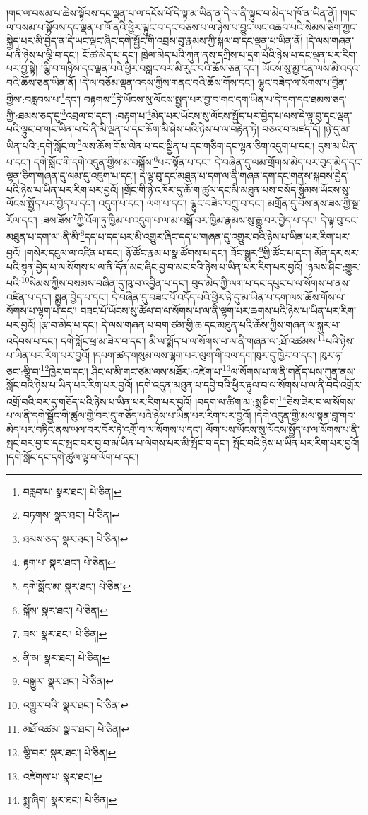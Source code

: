 །གང་ལ་བསམ་པ་ཆེས་སྟོབས་དང་ལྡན་པ་ལ་དངོས་པོ་དེ་ལྟ་མ་ཡིན་ན་དེ་ལ་ནི་ལྟུང་བ་མེད་པ་ཁོ་ན་ཡིན་ནོ། །གང་ལ་བསམ་པ་སྟོབས་དང་ལྡན་པ་ཁོ་ནའི་ཕྱིར་ལྟུང་བ་དང་བཅས་པ་ལ་ཉེས་པ་བྱུང་ཡང་འཆབ་པའི་སེམས་ཅིག་ཀྱང་སྐྱེད་པར་མི་བྱེད་ན་དེ་ཡང་ལྡང་ཞིང་དགེ་སྦྱོང་གི་འབྲས་བུ་རྣམས་ཀྱི་སྐལ་བ་དང་ལྡན་པ་ཡིན་ནོ། །དེ་ལས་གཞན་པ་ནི་ཉེས་པ་ལྕི་བ་དང་། ངོ་ཚ་མེད་པ་དང་། ཁྲེལ་མེད་པའི་ཀུན་ནས་དཀྲིས་པ་དྲག་པོའི་ཉེས་པ་དང་ལྡན་པར་རིག་པར་བྱ་སྟེ། །ལྕི་བ་གཉིས་དང་ལྡན་པའི་ཕྱིར་བསླང་བར་མི་རུང་བའི་ཆོས་ཅན་དང་། ཡོངས་སུ་མྱ་ངན་ལས་མི་འདའ་བའི་ཆོས་ཅན་ཡིན་ནོ། །དེ་ལ་བཅོམ་ལྡན་འདས་ཀྱིས་གནང་བའི་ཆོས་གོས་དང་། ལྷུང་བཟེད་ལ་སོགས་པ་བྱིན་གྱིས་:བརླབས་པ་\footnote{བརླབ་པ་  སྣར་ཐང་།  པེ་ཅིན། }དང་། བརྟགས་\footnote{བཏགས་  སྣར་ཐང་།  པེ་ཅིན། }ཏེ་ཡོངས་སུ་ལོངས་སྤྱད་པར་བྱ་བ་གང་དག་ཡིན་པ་དེ་དག་དང་ཐམས་ཅད་ཀྱི་:ཐམས་ཅད་དུ་\footnote{ཐམས་ཅད་  སྣར་ཐང་།  པེ་ཅིན། }འབྲལ་བ་དང་། :བརྟག་པ་\footnote{རྟག་པ་  སྣར་ཐང་།  པེ་ཅིན། }མེད་པར་ཡོངས་སུ་ལོངས་སྤྱོད་པར་བྱེད་པ་ལས་དེ་ལྟ་བུ་དང་ལྡན་པའི་ལྟུང་བ་གང་ཡིན་པ་དེ་ནི་མི་ལྡན་པ་དང་ཆོག་མི་ཤེས་པའི་ཉེས་པ་ལ་བརྟེན་ཏེ། བཅའ་བ་མཛད་དོ། །ཉེ་དུ་མ་ཡིན་པའི་:དགེ་སློང་ལ་\footnote{དགེ་སློང་མ་  སྣར་ཐང་།  པེ་ཅིན། }ལས་ཆོས་གོས་ལེན་པ་དང་སྦྱིན་པ་དང་གཅིག་དང་ལྷན་ཅིག་འདུག་པ་དང་། དུས་མ་ཡིན་པ་དང་། དགེ་སློང་གི་དགེ་འདུན་གྱིས་མ་བསྐོས་\footnote{སྐོས་  སྣར་ཐང་།  པེ་ཅིན། }པར་སྟོན་པ་དང་། དེ་བཞིན་དུ་ལམ་གྲོགས་མེད་པར་བུད་མེད་དང་ལྷན་ཅིག་གཞན་དུ་ལམ་དུ་འཇུག་པ་དང་། དེ་ལྟ་བུ་དང་མཐུན་པ་དག་ལ་ནི་གཞན་དག་དང་གནས་སྐབས་བྱེད་པའི་ཉེས་པ་ཡིན་པར་རིག་པར་བྱའོ། །གྲོང་གི་ཉེ་འཁོར་དུ་ཆོ་ག་ཚུལ་དང་མི་མཐུན་པས་བསོད་སྙོམས་ཡོངས་སུ་ལོངས་སྤྱོད་པར་བྱེད་པ་དང་། འདུག་པ་དང་། ལག་པ་དང་། ལྷུང་བཟེད་བཀྲུ་བ་དང་། མགྲོན་དུ་བོས་ནས་ཟས་ཀྱི་སྔ་རོལ་དང་། :ཟས་ཟོས་\footnote{ཟས་  སྣར་ཐང་།  པེ་ཅིན། }ཀྱི་འོག་ཏུ་ཁྱིམ་པ་འདུག་པ་ལ་མ་བསྒོ་བར་ཁྱིམ་རྣམས་སུ་རྒྱུ་བར་བྱེད་པ་དང་། དེ་ལྟ་བུ་དང་མཐུན་པ་དག་ལ་:ནི་མི་\footnote{ནི་མ་  སྣར་ཐང་།  པེ་ཅིན། }དད་པ་དད་པར་མི་འགྱུར་ཞིང་དད་པ་གཞན་དུ་འགྱུར་བའི་ཉེས་པ་ཡིན་པར་རིག་པར་བྱའོ། །གསེར་དངུལ་ལ་འཛིན་པ་དང་། ཉོ་ཚོང་རྣམ་པ་སྣ་ཚོགས་པ་དང་། ཟོང་སྒྱུར་\footnote{བསྒྱུར་  སྣར་ཐང་།  པེ་ཅིན། }གྱི་ཚོང་པ་དང་། མོན་དར་སར་པའི་སྟན་བྱེད་པ་ལ་སོགས་པ་ལ་ནི་དོན་མང་ཞིང་བྱ་བ་མང་བའི་ཉེས་པ་ཡིན་པར་རིག་པར་བྱའོ། །ཉམས་ཤིང་:གྱུར་པའི་\footnote{འགྱུར་བའི་  སྣར་ཐང་།  པེ་ཅིན། }སེམས་ཀྱིས་བསམས་བཞིན་དུ་ཁུ་བ་འབྱིན་པ་དང་། བུད་མེད་ཀྱི་ལག་པ་དང་དཔུང་པ་ལ་སོགས་པ་ནས་འཛིན་པ་དང་། སྨྱན་བྱེད་པ་དང་། དེ་བཞིན་དུ་བཟང་པོ་འདོད་པའི་ཕྱིར་ཉེ་དུ་མ་ཡིན་པ་དག་ལས་ཆོས་གོས་ལ་སོགས་པ་ལྷག་པ་དང་། བཟང་པོ་ཡོངས་སུ་ཚོལ་བ་ལ་སོགས་པ་ལ་ནི་ལྷག་པར་ཆགས་པའི་ཉེས་པ་ཡིན་པར་རིག་པར་བྱའོ། །རྩ་བ་མེད་པ་དང་། དེ་ལས་གཞན་པ་བག་ཙམ་གྱི་ཆ་དང་མཐུན་པའི་ཆོས་ཀྱིས་གཞན་ལ་སྐུར་པ་འདེབས་པ་དང་། དགེ་སློང་ཕྲ་མ་ཟེར་བ་དང་། མི་ལ་སྨོད་པ་ལ་སོགས་པ་ལ་ནི་གཞན་ལ་:ཐོ་འཚམས་\footnote{མཐོ་འཚམ་  སྣར་ཐང་།  པེ་ཅིན། }པའི་ཉེས་པ་ཡིན་པར་རིག་པར་བྱའོ། །དཔག་ཚད་གསུམ་ལས་ལྷག་པར་ལུག་གི་བལ་དག་ཁུར་དུ་ཁྱེར་བ་དང་། ཁུར་ཧ་ཅང་:ལྕི་བ་\footnote{ལྕི་བར་  སྣར་ཐང་།  པེ་ཅིན། }ཁྱེར་བ་དང་། ཤིང་ལ་མི་གང་ཙམ་ལས་མཐོར་:འཛེག་པ་\footnote{འཛེགས་པ་  སྣར་ཐང་། }ལ་སོགས་པ་ལ་ནི་གནོད་པས་ཀུན་ནས་སློང་བའི་ཉེས་པ་ཡིན་པར་རིག་པར་བྱའོ། །དགེ་འདུན་མཐུན་པ་དབྱེ་བའི་ཕྱིར་རྟུལ་བ་ལ་སོགས་པ་ལ་ནི་བདེ་འགྲོར་འགྲོ་བའི་བར་དུ་གཅོད་པའི་ཉེས་པ་ཡིན་པར་རིག་པར་བྱའོ། །བདག་ལ་ཚིག་མ་:སྨྲ་ཤིག་\footnote{སྨྲ་ཞིག་  སྣར་ཐང་།  པེ་ཅིན། }ཅེས་ཟེར་བ་ལ་སོགས་པ་ལ་ནི་དགེ་སྦྱོང་གི་ཚུལ་གྱི་བར་དུ་གཅོད་པའི་ཉེས་པ་ཡིན་པར་རིག་པར་བྱའོ། །དགེ་འདུན་གྱི་མལ་སྟན་བླ་གབ་མེད་པར་བཏིང་ནས་ཡལ་བར་བོར་ཏེ་འགྲོ་བ་ལ་སོགས་པ་དང་། ལོག་པས་ཡོངས་སུ་ལོངས་སྤྱོད་པ་ལ་སོགས་པ་ནི་སྤང་བར་བྱ་བ་དང་སྤང་བར་བྱ་བ་མ་ཡིན་པ་ལེགས་པར་མི་སྤོང་བ་དང་། སྤོང་བའི་ཉེས་པ་ཡིན་པར་རིག་པར་བྱའོ། །དགེ་སློང་དང་དགེ་ཚུལ་ལྟ་བ་ལོག་པ་དང་། 